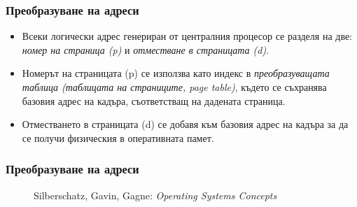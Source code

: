 \documentclass[ignorenonframetext, hyperref=unicode]{beamer}
\begin{document}
\begin{frame}
\frametitle{Преобразуване на адреси}
\begin{itemize}
  \item Всеки логически адрес генериран от централния процесор се разделя на
  две: {\em номер на страница (p)} и {\em отместване в страницата (d)}.
  \item Номерът на страницата (p) се използва като индекс в {\em
  преобразуващата таблица (таблицата на страниците, page table)}, където се
  съхранява базовия адрес на кадъра, съответстващ на дадената страница.
  \item Отместването в страницата (d) се добавя към базовия адрес на кадъра за
  да се получи физическия в оперативната памет.
\end{itemize}
\end{frame}

\begin{frame}
\frametitle{Преобразуване на адреси}
\begin{figure}[h]
\center
{}
\caption{Silberschatz, Gavin, Gagne: {\em Operating Systems Concepts}}
\end{figure}
\end{frame}
\end{document}
